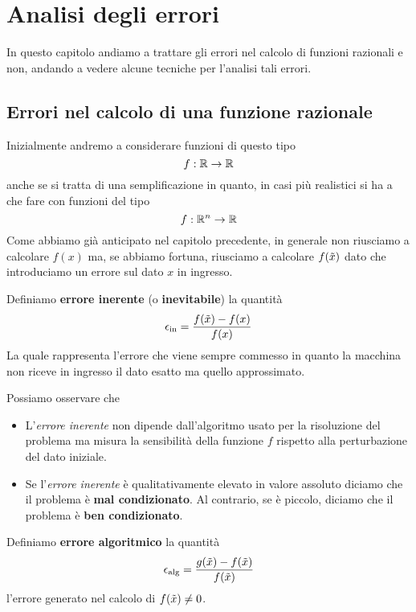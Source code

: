 \chapter{Analisi degli errori}
In questo capitolo andiamo a trattare gli errori nel calcolo di funzioni razionali e non, andando a vedere
alcune tecniche per l'analisi tali errori.

\section{Errori nel calcolo di una funzione razionale}
Inizialmente andremo a considerare funzioni di questo tipo
\[ f : \mathbb{R} \to \mathbb{R}\]
anche se si tratta di una semplificazione in quanto, in casi più realistici si ha a che fare con funzioni del tipo
\[ f : \mathbb{R}^n \to \mathbb{R} \]
Come abbiamo già anticipato nel capitolo precedente, in generale non riusciamo a calcolare $f(x)$ ma, se abbiamo
fortuna, riusciamo a calcolare $f(\tilde{x})$ dato che introduciamo un errore sul dato $x$ in ingresso.

\begin{definition}\label{def: errore_inerente}
	Definiamo \textbf{errore inerente} (o \textbf{inevitabile}) la quantità
	\[ \epsilon_{\text{in}} = \frac{f(\tilde{x}) - f(x)}{f(x)} \]
	La quale rappresenta l'errore che viene sempre commesso in quanto la macchina non riceve in ingresso
	il dato esatto ma quello approssimato.
\end{definition}

\begin{observation}
	Possiamo osservare che
	\begin{itemize}
		\item L'\emph{errore inerente} non dipende dall'algoritmo usato per la risoluzione del problema ma
		      misura la sensibilità della funzione $f$ rispetto alla perturbazione del dato iniziale.
		\item Se l'\emph{errore inerente} è qualitativamente elevato in valore assoluto diciamo che il problema
		      è \textbf{mal condizionato}. Al contrario, se è piccolo, diciamo che il problema è
		      \textbf{ben condizionato}.
	\end{itemize}
\end{observation}

\begin{definition}\label{def: errore_algoritmico}
	Definiamo \textbf{errore algoritmico} la quantità
	\[ \epsilon_{\text{alg}} = \frac{g(\tilde{x}) - f(\tilde{x})}{f(\tilde{x})} \]
	l'errore generato nel calcolo di $f(\tilde{x}) \neq 0$.
\end{definition}

